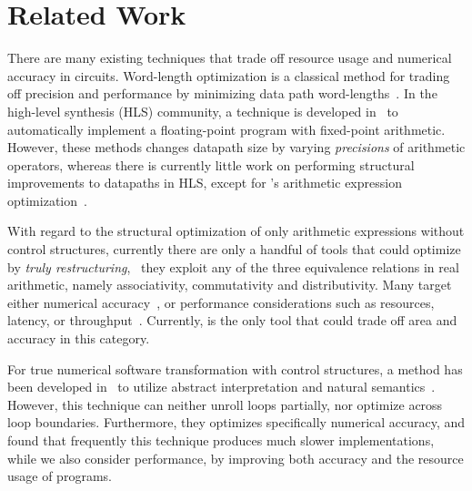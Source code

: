 \section{Related Work}
\label{sec:related_work}

There are many existing techniques that trade off resource usage and
numerical accuracy in circuits.  Word-length optimization is a classical
method for trading off precision and performance by minimizing data path
word-lengths~\cite{constantinides}.  In the high-level synthesis (HLS)
community, a technique is developed in~\cite{menard12} to automatically
implement a floating-point program with fixed-point arithmetic.  However,
these methods changes datapath size by varying \emph{precisions} of arithmetic
operators, whereas there is currently little work on performing structural
improvements to datapaths in HLS, except for \soap{}'s arithmetic expression
optimization~\cite{soap}.

With regard to the structural optimization of only arithmetic expressions
without control structures, currently there are only a handful of tools that
could optimize by \emph{truly restructuring}, \ie~they exploit any of the three
equivalence relations in real arithmetic, namely associativity, commutativity
and distributivity.  Many target either numerical accuracy~\cite{martel07,
ioualalen}, or performance considerations such as resources, latency, or
throughput~\cite{gcc, llvm, vivado_hls, mouilleron, hosangadi, peymandoust}.
Currently, \soap{} is the only tool that could trade off area and accuracy in
this category.

For true numerical software transformation with control structures, a
method has been developed in~\cite{martel09} to utilize abstract interpretation
and natural semantics~\cite{kahn87}.  However, this technique can neither
unroll loops partially, nor optimize across loop boundaries.  Furthermore,
they optimizes specifically numerical accuracy, and found that frequently
this technique produces much slower implementations, while we also consider
performance, by improving both accuracy and the resource usage of programs.

